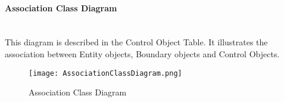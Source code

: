 \newpage
\paragraph{Association Class Diagram}\mbox{}\\

This diagram is described in the Control Object Table. It illustrates the association between Entity objects, Boundary objects and Control Objects.
\begin{figure}[ht!]
\centering
\texttt{[image: AssociationClassDiagram.png]}
\caption{Association Class Diagram \label{overflow}}
\end{figure}